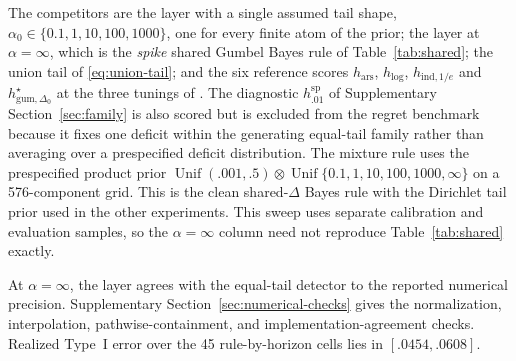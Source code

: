\documentclass[11pt]{article}
\newcommand{\Unif}{\operatorname{Unif}}
\begin{document}
The competitors are the layer with a single assumed tail shape, $\alpha_0\in\{0.1,1,10,100,1000\}$, one for every finite atom of the prior; the layer at $\alpha=\infty$, which is the \emph{spike} shared Gumbel Bayes rule of Table~\ref{tab:shared}; the union tail of \eqref{eq:union-tail}; and the six reference scores $h_{\mathrm{ars}}$, $h_{\log}$, $h_{\mathrm{ind},1/e}$ and $h^\star_{\mathrm{gum},\Delta_0}$ at the three tunings of \citet{li2025framework}.  The diagnostic $h^{\mathrm{sp}}_{.01}$ of Supplementary Section~\ref{sec:family} is also scored but is excluded from the regret benchmark because it fixes one deficit within the generating equal-tail family rather than averaging over a prespecified deficit distribution.  The mixture rule uses the prespecified product prior $\Unif(.001,.5)\otimes\Unif\{0.1,1,10,100,1000,\infty\}$ on a 576-component grid.  This is the clean shared-$\Delta$ Bayes rule with the Dirichlet tail prior used in the other experiments.  This sweep uses separate calibration and evaluation samples, so the $\alpha=\infty$ column need not reproduce Table~\ref{tab:shared} exactly.

At $\alpha=\infty$, the layer agrees with the equal-tail detector to the reported numerical precision.  Supplementary Section~\ref{sec:numerical-checks} gives the normalization, interpolation, pathwise-containment, and implementation-agreement checks.  Realized Type~I error over the 45 rule-by-horizon cells lies in $[.0454,.0608]$.
\end{document}
